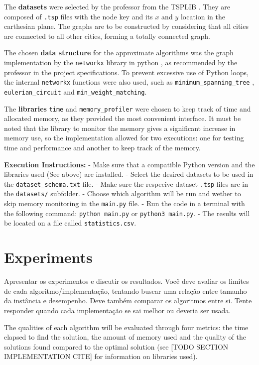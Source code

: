 \documentclass[12pt]{article}
\begin{document}
The \textbf{datasets} were selected by the professor from the TSPLIB \cite{datasets_lib}. They are 
composed of \texttt{.tsp} files with the node key and its $x$ and $y$ location in the carthesian plane. 
The graphs are to be constructed by considering that all cities are connected to all other cities, forming 
a totally connected graph.

The chosen \textbf{data structure} for the approximate algorithms was the graph implementation 
by the \texttt{networkx} library in python \cite{networkx_docs}, as recommended by 
the professor in the project specifications. To prevent excessive use of Python loops, 
the internal \texttt{networkx} functions were also used, such as \texttt{minimum\_spanning\_tree} , 
\texttt{eulerian\_circuit} and \texttt{min\_weight\_matching}.

The \textbf{libraries} \texttt{time} and \texttt{memory\_profiler} were chosen to keep track of time 
and allocated memory, as they provided the most convenient interface. It must be noted that the library 
to monitor the memory gives a significant increase in memory use, so the implementation allowed for 
two executions: one for testing time and performance and another to keep track of the memory.

\textbf{Execution Instructions:}
- Make sure that a compatible Python version and the libraries used (See above) are installed.
- Select the desired datasets to be used in the \texttt{dataset_schema.txt} file.
- Make sure the respecive dataset \texttt{.tsp} files are in the \texttt{datasets/} subfolder.
- Choose which algorithm will be run and wether to skip memory monitoring in the \texttt{main.py} file.
- Run the code in a terminal with the following command: \texttt{python main.py} or \texttt{python3 main.py}.
- The results will be located on a file called \texttt{statistics.csv}.

\section{Experiments} \label{sec:firstpage}
    Apresentar os experimentos e discutir os resultados. Você deve avaliar os
    limites de cada algoritmo/implementação, tentando buscar uma relação entre
    tamanho da instância e desempenho. Deve também comparar os algoritmos
    entre si. Tente responder quando cada implementação se sai melhor ou
    deveria ser usada.

The qualities of each algorithm will be evaluated through four metrics: the time elapsed 
to find the solution, the amount of memory used and the quality of the solutions found 
compared to the optimal solution (see [TODO SECTION IMPLEMENTATION CITE] for information 
on libraries used).
\end{document}
